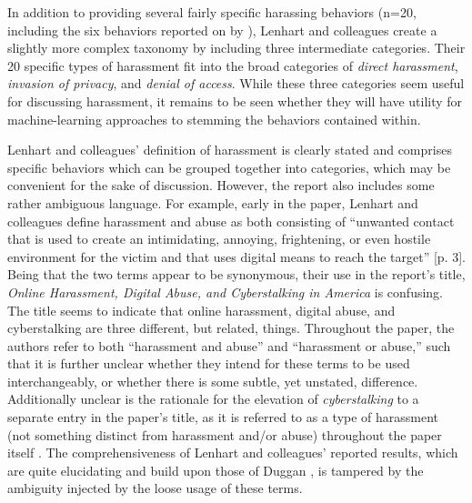 \documentclass{sigchi}
\begin{document}
In addition to providing several fairly specific harassing behaviors (n=20, including the six behaviors reported on by \cite{Duggan2014Online}), Lenhart and colleagues \cite{Lenhart2016Online} create a slightly more complex taxonomy by including three intermediate categories.  Their 20 specific types of harassment fit into the broad categories of \textit{direct harassment}, \textit{invasion of privacy}, and \textit{denial of access}.  While these three categories seem useful for discussing harassment, it remains to be seen whether they will have utility for machine-learning approaches to stemming the behaviors contained within.

Lenhart and colleagues' \cite{Lenhart2016Online} definition of harassment is clearly stated and comprises specific behaviors which can be grouped together into categories, which may be convenient for the sake of discussion.  However, the report also includes some rather ambiguous language.  For example, early in the paper, Lenhart and colleagues define harassment and abuse as both consisting of ``unwanted contact that is used to create an intimidating, annoying, frightening, or even hostile environment for the victim and that uses digital means to reach the target'' [p. 3].  Being that the two terms appear to be synonymous, their use in the report's title, \textit{Online Harassment, Digital Abuse, and Cyberstalking in America} is confusing.  The title seems to indicate that online harassment, digital abuse, and cyberstalking are three different, but related, things.  Throughout the paper, the authors refer to both ``harassment and abuse'' and ``harassment or abuse,'' such that it is further unclear whether they intend for these terms to be used interchangeably, or whether there is some subtle, yet unstated, difference.  Additionally unclear is the rationale for the elevation of \textit{cyberstalking} to a separate entry in the paper's title, as it is referred to as a type of harassment (not something distinct from harassment and/or abuse) throughout the paper itself \footnotemark[1].  The comprehensiveness of Lenhart and colleagues' reported results, which are quite elucidating and build upon those of Duggan \cite{Duggan2014Online}, is tampered by the ambiguity injected by the loose usage of these terms.

\end{document}
